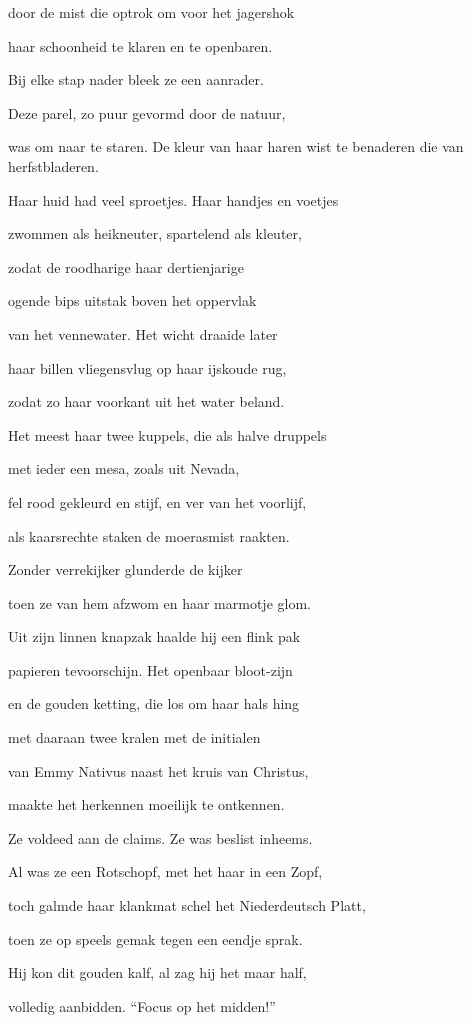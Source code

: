 door de mist die optrok
om voor het jagershok

haar schoonheid te klaren
en te openbaren.

Bij elke stap nader
bleek ze een aanrader.

Deze parel, zo puur
gevormd door de natuur,

was om naar te staren.
De kleur van haar haren
wist te benaderen
die van herfstbladeren.

Haar huid had veel sproetjes.
Haar handjes en voetjes

zwommen als heikneuter,
spartelend als kleuter,

zodat de roodharige
haar dertienjarige

ogende bips uitstak
boven het oppervlak

van het vennewater.
Het wicht draaide later

haar billen vliegensvlug
op haar ijskoude rug,

zodat zo haar voorkant
uit het water beland.

Het meest haar twee kuppels,
die als halve druppels

met ieder een mesa,
zoals uit Nevada,

fel rood gekleurd en stijf,
en ver van het voorlijf,

als kaarsrechte staken
de moerasmist raakten.

Zonder verrekijker
glunderde de kijker

toen ze van hem afzwom
en haar marmotje glom.

Uit zijn linnen knapzak
haalde hij een flink pak

papieren tevoorschijn.
Het openbaar bloot-zijn

en de gouden ketting,
die los om haar hals hing

met daaraan twee kralen
met de initialen

van Emmy Nativus
naast het kruis van Christus,

maakte het herkennen
moeilijk te ontkennen.

Ze voldeed aan de claims.
Ze was beslist inheems.

Al was ze een Rotschopf,
met het haar in een Zopf,

toch galmde haar klankmat
schel het Niederdeutsch Platt,

toen ze op speels gemak
tegen een eendje sprak.

Hij kon dit gouden kalf,
al zag hij het maar half,

volledig aanbidden.
“Focus op het midden!”

